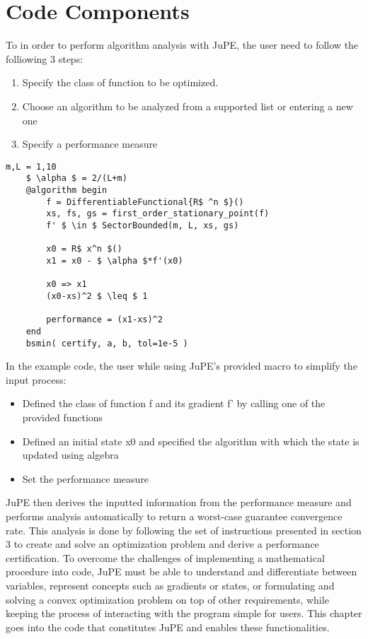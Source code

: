 \chapter{Code Components}

To in order to perform algorithm analysis with JuPE, the user need to follow the folliowing 3 steps:
\begin{enumerate}
	\item Specify the class of function to be optimized.
	\item Choose an algorithm to be analyzed from a supported list or entering a new one 
	\item Specify a performance measure
  \end{enumerate}

\begin{lstlisting}[mathescape]
	m,L = 1,10
	$ \alpha $ = 2/(L+m)
	@algorithm begin
		f = DifferentiableFunctional{R$ ^n $}()
		xs, fs, gs = first_order_stationary_point(f)
		f' $ \in $ SectorBounded(m, L, xs, gs)

		x0 = R$ x^n $()
		x1 = x0 - $ \alpha $*f'(x0)

		x0 => x1
		(x0-xs)^2 $ \leq $ 1

		performance = (x1-xs)^2
	end
	bsmin( certify, a, b, tol=1e-5 )
\end{lstlisting}

In the example code, the user while using JuPE's provided macro to simplify the input process:
\begin{itemize}
	\item Defined the class of function f and its gradient f' by calling one of the provided functions
	\item Defined an initial state x0 and specified the algorithm with which the state is updated using algebra
	\item Set the performance measure
\end{itemize}
JuPE then derives the inputted information from the performance measure and performs analysis automatically to return a worst-case guarantee convergence rate. This analysis is done by following the set of instructions presented in section 3 to create and solve an optimization problem and derive a performance certification. To overcome the challenges of implementing a mathematical procedure into code, JuPE must be able to understand and differentiate between variables, represent concepts such as gradients or states, or formulating and solving a convex optimization problem on top of other requirements, while keeping the process of interacting with the program simple for users. This chapter goes into the code that constitutes JuPE and enables these functionalities.

